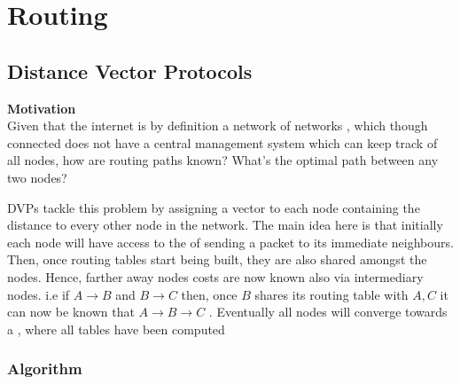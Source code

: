 \section{Routing}
\subsection{Distance Vector Protocols}

\par{\textbf{Motivation} \\ Given that the internet is by definition a network of networks , which though connected does not have a central management system which can keep track of all nodes, how are routing paths known? What's the optimal path between any two nodes? \\}

\par{DVPs tackle this problem by assigning a vector to each node containing the distance to every other node in the network. The main idea here is that initially each node will have access to the  of sending a packet to its immediate neighbours. Then, once routing tables start being built, they are also shared amongst the nodes. Hence, farther away nodes costs are now known also via intermediary nodes. i.e if $A \rightarrow B$ and $B \rightarrow C$ then, once $B$ shares its routing table with $A, C$ it can now be known that $A \rightarrow B \rightarrow C$ . Eventually all nodes will converge towards a , where all tables have been computed}




\subsubsection{Algorithm}


